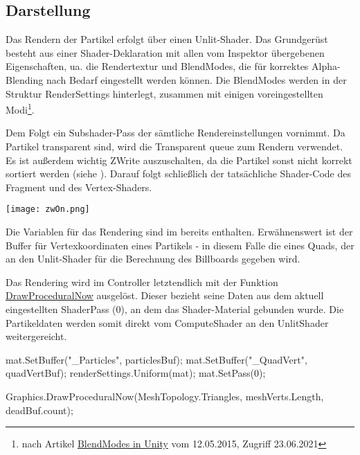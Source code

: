 \subsection{Darstellung}

Das Rendern der Partikel erfolgt über einen Unlit-Shader. Das Grundgerüst besteht aus einer Shader-Deklaration mit allen vom Inspektor übergebenen Eigenschaften, ua. die Rendertextur und BlendModes, die für korrektes Alpha-Blending nach Bedarf eingestellt werden können. Die BlendModes werden in der Struktur RenderSettings hinterlegt, zusammen mit einigen voreingestellten Modi\footnote{nach Artikel \href{https://elringus.me/blend-modes-in-unity}{BlendModes in Unity} vom 12.05.2015, Zugriff 23.06.2021}.

Dem Folgt ein Subshader-Pass der sämtliche Rendereinstellungen vornimmt. Da Partikel transparent sind, wird die Transparent queue zum Rendern verwendet. Es ist außerdem wichtig ZWrite auszuschalten, da die Partikel sonst nicht korrekt sortiert werden (siehe ). Darauf folgt schließlich der tatsächliche Shader-Code des Fragment und des Vertex-Shaders.

\begin{minipage}{\linewidth}
\begin{center}
\vspace{5mm}
\captionsetup{type=figure}
\texttt{[image: zwOn.png]}
\label{img:zoff}
\end{center}
\end{minipage}

Die Variablen für das Rendering sind im  bereits enthalten. Erwähnenswert ist der Buffer für Vertexkoordinaten eines Partikels - in diesem Falle die eines Quads, der an den Unlit-Shader für die Berechnung des Billboards gegeben wird.

Das Rendering wird im Controller letztendlich mit der Funktion \href{https://docs.unity3d.com/ScriptReference/Graphics.DrawProceduralNow.html}{DrawProceduralNow} ausgelöst. Dieser bezieht seine Daten aus dem aktuell eingestellten ShaderPass (0), an dem das Shader-Material gebunden wurde. Die Partikeldaten werden somit direkt vom ComputeShader an den UnlitShader weitergereicht.

\begin{csh}[caption=Partikel Rendering]
mat.SetBuffer("_Particles", particlesBuf);
mat.SetBuffer("_QuadVert", quadVertBuf);
renderSettings.Uniform(mat);
mat.SetPass(0);

Graphics.DrawProceduralNow(MeshTopology.Triangles, meshVerts.Length, deadBuf.count);
\end{csh}

